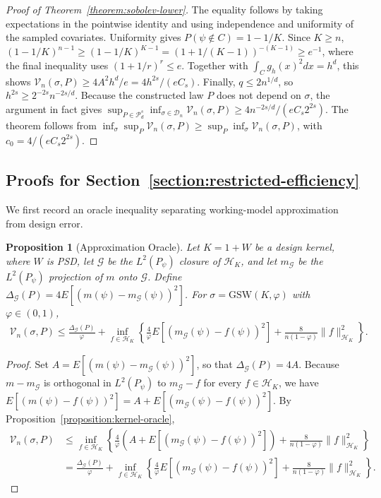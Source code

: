 \documentclass[letterpaper,12pt]{article}
\newtheorem{prop}[thm]{Proposition}
\theoremstyle{definition}
\numberwithin{equation}{section}
\newcommand{\mc}{\mathcal}
\newcommand{\norm}[1]{\lVert#1\rVert}
\begin{document}
\begin{proof}[Proof of Theorem~\ref{theorem:sobolev-lower}]
The equality follows by taking expectations in the pointwise identity and using independence and uniformity of the sampled covariates. Uniformity gives $P(\psi\notin C)=1-1/K$. Since $K\geq n$, $(1-1/K)^{n-1}\geq(1-1/K)^{K-1}=(1+1/(K-1))^{-(K-1)}\geq e^{-1}$, where the final inequality uses $(1+1/r)^r\leq e$. Together with $\int_Cg_h(x)^2dx=h^d$, this shows $\mc V_n(\sigma,P)\geq4A^2h^d/e=4h^{2s}/(eC_s)$. Finally, $q\leq2n^{1/d}$, so $h^{2s}\geq2^{-2s}n^{-2s/d}$. Because the constructed law $P$ does not depend on $\sigma$, the argument in fact gives $\sup_{P\in\mc P_d^s}\inf_{\sigma\in\mc D_n}\mc V_n(\sigma,P)\geq4n^{-2s/d}/(eC_s2^{2s})$. The theorem follows from $\inf_\sigma\sup_P\mc V_n(\sigma,P)\geq\sup_P\inf_\sigma\mc V_n(\sigma,P)$, with $c_0=4/(eC_s2^{2s})$.
\end{proof}

\subsection{Proofs for Section~\ref{section:restricted-efficiency}}\label{appendix:proofs-restricted-efficiency}

We first record an oracle inequality separating working-model approximation from design error.

\begin{prop}[Approximation Oracle]\label{proposition:proof-restricted-kernel-comparison}
Let $K=1+W$ be a design kernel, where $W$ is PSD, let $\mc G$ be the $L^2(P_\psi)$ closure of $\mc H_K$, and let $m_{\mc G}$ be the $L^2(P_\psi)$ projection of $m$ onto $\mc G$.
Define $\Delta_{\mc G}(P)=4E[(m(\psi)-m_{\mc G}(\psi))^2]$.
For $\sigma=\mathrm{GSW}(K,\varphi)$ with $\varphi\in(0,1)$,
\begin{align*}
\mc V_n(\sigma,P)\leq\frac{\Delta_{\mc G}(P)}{\varphi}+\inf_{f\in\mc H_K}\left\{\frac4\varphi E[(m_{\mc G}(\psi)-f(\psi))^2]+\frac8{n(1-\varphi)}\norm{f}_{\mc H_K}^2\right\}.
\end{align*}
\end{prop}

\begin{proof}
Set $A=E[(m(\psi)-m_{\mc G}(\psi))^2]$, so that $\Delta_{\mc G}(P)=4A$.
Because $m-m_{\mc G}$ is orthogonal in $L^2(P_\psi)$ to $m_{\mc G}-f$ for every $f\in\mc H_K$, we have $E[(m(\psi)-f(\psi))^2]=A+E[(m_{\mc G}(\psi)-f(\psi))^2]$.
By Proposition~\ref{proposition:kernel-oracle},
\begin{align*}
\mc V_n(\sigma,P)&\leq\inf_{f\in\mc H_K}\left\{\frac4\varphi\left(A+E[(m_{\mc G}(\psi)-f(\psi))^2]\right)+\frac8{n(1-\varphi)}\norm{f}_{\mc H_K}^2\right\}\\
&=\frac{\Delta_{\mc G}(P)}{\varphi}+\inf_{f\in\mc H_K}\left\{\frac4\varphi E[(m_{\mc G}(\psi)-f(\psi))^2]+\frac8{n(1-\varphi)}\norm{f}_{\mc H_K}^2\right\}.
\end{align*}
\end{proof}
\end{document}

